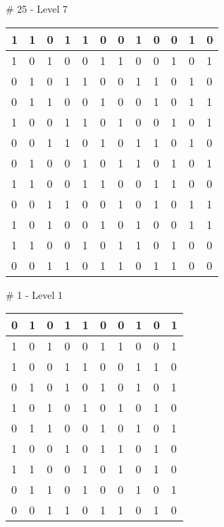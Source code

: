 \smallskip

\# 25 - Level 7 \newline
\begin{tabular}{|m{\collen}|m{\collen}|m{\collen}|m{\collen}|m{\collen}|m{\collen}|m{\collen}|m{\collen}|m{\collen}|m{\collen}|m{\collen}|m{\collen}|}
\hline
  1 & 1 & 0 & 1 & 1 & 0 & 0 & 1 & 0 & 0 & 1 & 0 \\
\hline
  1 & 0 & 1 & 0 & 0 & 1 & 1 & 0 & 0 & 1 & 0 & 1 \\
\hline
  0 & 1 & 0 & 1 & 1 & 0 & 0 & 1 & 1 & 0 & 1 & 0 \\
\hline
  0 & 1 & 1 & 0 & 0 & 1 & 0 & 0 & 1 & 0 & 1 & 1 \\
\hline
  1 & 0 & 0 & 1 & 1 & 0 & 1 & 0 & 0 & 1 & 0 & 1 \\
\hline
  0 & 0 & 1 & 1 & 0 & 1 & 0 & 1 & 1 & 0 & 1 & 0 \\
\hline
  0 & 1 & 0 & 0 & 1 & 0 & 1 & 1 & 0 & 1 & 0 & 1 \\
\hline
  1 & 1 & 0 & 0 & 1 & 1 & 0 & 0 & 1 & 1 & 0 & 0 \\
\hline
  0 & 0 & 1 & 1 & 0 & 0 & 1 & 0 & 1 & 0 & 1 & 1 \\
\hline
  1 & 0 & 1 & 0 & 0 & 1 & 0 & 1 & 0 & 0 & 1 & 1 \\
\hline
  1 & 1 & 0 & 0 & 1 & 0 & 1 & 1 & 0 & 1 & 0 & 0 \\
\hline
  0 & 0 & 1 & 1 & 0 & 1 & 1 & 0 & 1 & 1 & 0 & 0 \\
\hline
\end{tabular}


\smallskip

\# 1 - Level 1 \newline
\begin{tabular}{|m{\collen}|m{\collen}|m{\collen}|m{\collen}|m{\collen}|m{\collen}|m{\collen}|m{\collen}|m{\collen}|m{\collen}|}
\hline
  0 & 1 & 0 & 1 & 1 & 0 & 0 & 1 & 0 & 1 \\
\hline
  1 & 0 & 1 & 0 & 0 & 1 & 1 & 0 & 0 & 1 \\
\hline
  1 & 0 & 0 & 1 & 1 & 0 & 0 & 1 & 1 & 0 \\
\hline
  0 & 1 & 0 & 1 & 0 & 1 & 0 & 1 & 0 & 1 \\
\hline
  1 & 0 & 1 & 0 & 1 & 0 & 1 & 0 & 1 & 0 \\
\hline
  0 & 1 & 1 & 0 & 0 & 1 & 0 & 1 & 0 & 1 \\
\hline
  1 & 0 & 0 & 1 & 0 & 1 & 1 & 0 & 1 & 0 \\
\hline
  1 & 1 & 0 & 0 & 1 & 0 & 1 & 0 & 1 & 0 \\
\hline
  0 & 1 & 1 & 0 & 1 & 0 & 0 & 1 & 0 & 1 \\
\hline
  0 & 0 & 1 & 1 & 0 & 1 & 1 & 0 & 1 & 0 \\
\hline
\end{tabular}


